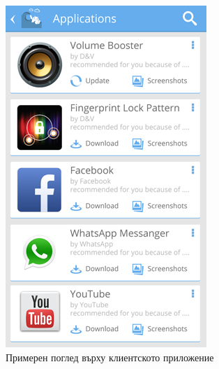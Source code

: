 	\begin{figure}[htbp]
		\centering
 		\includegraphics{assets/tsunapper-app-recommendations.png}
		\caption{Примерен поглед върху клиентското приложение}
		\label{figure:client-recommendations}
	\end{figure}
